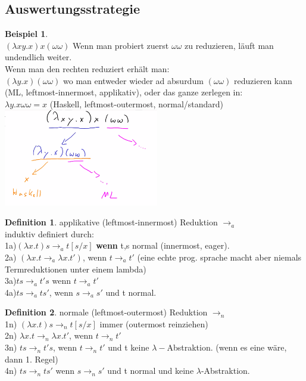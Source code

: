 \documentclass{article}
\theoremstyle{definition}
\newtheorem{beispiel}{Beispiel}[section]
\newtheorem{definition}{Definition}[section]
\begin{document}
	\subsection{Auswertungsstrategie}
	\begin{beispiel}\ \\
	$(\lambda xy.x)x(\omega\omega)$ Wenn man probiert zuerst $\omega\omega$ zu reduzieren, läuft man undendlich weiter.\\
	Wenn man den rechten reduziert erhält man:\\
	$(\lambda y.x)(\omega\omega)$ wo man entweder wieder ad absurdum $(\omega\omega)$ reduzieren kann (ML, leftmost-innermost, applikativ), oder das ganze zerlegen in:\\
	$\lambda y.x \omega \omega = x$ (Haskell, leftmost-outermost, normal/standard)\\
	\includegraphics[width=256px]{images/AuswertungsReihenfolge.png}
	\end{beispiel}
	\begin{definition} applikative (leftmost-innermost) Reduktion $\to_a$\\
	induktiv definiert durch:\\
	1a)$(\lambda x.t)s\to_a t[s/x]$ \textbf{wenn} t,s normal (innermost, eager).\\
	2a) $(\lambda x.t\to_a \lambda x.t')$, wenn $t\to_a t'$ (eine echte prog. sprache macht aber niemals Termreduktionen unter einem lambda)\\
	3a)$ts\to_a t's$ wenn $t\to_a t'$\\
	4a)$ts\to_a ts'$, wenn $s\to_a s'$ und t normal.
	\end{definition}
	\begin{definition} normale (leftmost-outermost) Reduktion $\to_n$\\
	1n) $(\lambda x.t)s\to_n t[s/x]$ immer (outermost reinziehen)\\
	2n) $\lambda x.t\to_n \lambda x.t'$, wenn $t\to_n t'$\\
	3n) $ts\to_n t's$, wenn $t\to_n t'$ und t keine $\lambda-$Abstraktion. (wenn es eine wäre, dann 1. Regel)\\
	4n) $ts\to_n ts'$ wenn $s\to_n s'$ und t normal und keine $\lambda$-Abstraktion.\\
	\end{definition}
\end{document}
